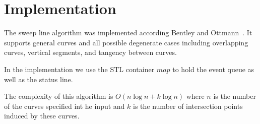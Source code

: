 \section{Implementation}

The sweep line algorithm was implemented according 
Bentley and Ottmann~\cite{bkos-cgaa-97}. It supports general 
curves and all 
possible degenerate cases including overlapping curves, vertical segments, 
and tangency between curves.

In the implementation we use the STL container $map$ to hold the event queue 
as well as the status line. 

The complexity of this algorithm is $O(n\log{n} + k\log{n})$ where $n$ is the 
number of the curves specified int he input and $k$ is the number of 
intersection points induced by these curves.
